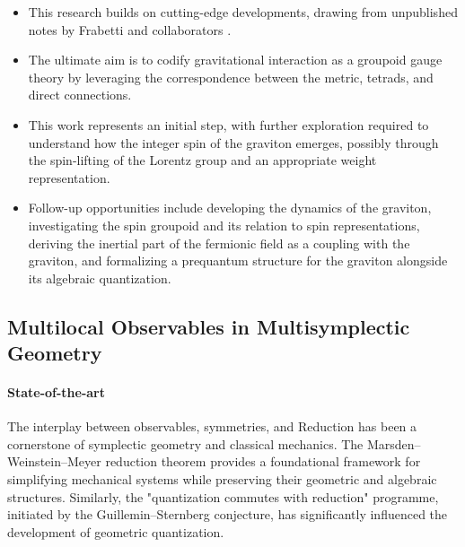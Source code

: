\documentclass[11pt,a4paper]{article}
\begin{document}
\begin{itemize}[noitemsep, topsep=0pt, parsep=0pt, partopsep=0pt]
    \item This research builds on cutting-edge developments, drawing from unpublished notes by Frabetti and collaborators \cite{Azzali2022}.
    \item The ultimate aim is to codify gravitational interaction as a groupoid gauge theory by leveraging the correspondence between the metric, tetrads, and direct connections.
    \item This work represents an initial step, with further exploration required to understand how the integer spin of the graviton emerges, possibly through the spin-lifting of the Lorentz group and an appropriate weight representation.
    \item Follow-up opportunities include developing the dynamics of the graviton, investigating the spin groupoid and its relation to spin representations, deriving the inertial part of the fermionic field as a coupling with the graviton, and formalizing a prequantum structure for the graviton alongside its algebraic quantization.
\end{itemize}




\subsection{Multilocal Observables in Multisymplectic Geometry}
\label{wp:MultiLocObs}

\paragraph{State-of-the-art}

The interplay between observables, symmetries, and Reduction has been a cornerstone of symplectic geometry and classical mechanics. The Marsden–Weinstein–Meyer reduction theorem provides a foundational framework for simplifying mechanical systems while preserving their geometric and algebraic structures. Similarly, the "quantization commutes with reduction" programme, initiated by the Guillemin–Sternberg conjecture, has significantly influenced the development of geometric quantization.
\end{document}
